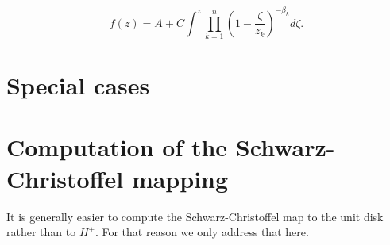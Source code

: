\documentclass[a4paper,10pt]{amsart}
\newcommand{\sch}{Schwarz-Christoffel }
\begin{document}
\begin{equation}
f(z) = A + C \int^z \prod_{k=1}^{n} (1 - \frac{\zeta}{z_k})^{-\beta_k} d\zeta.
\end{equation}


\section{Special cases}




\section{Computation of the \sch mapping}

It is generally easier to compute the \sch map to the unit disk rather than to $H^+$. For that reason we only address that here.









\end{document}
